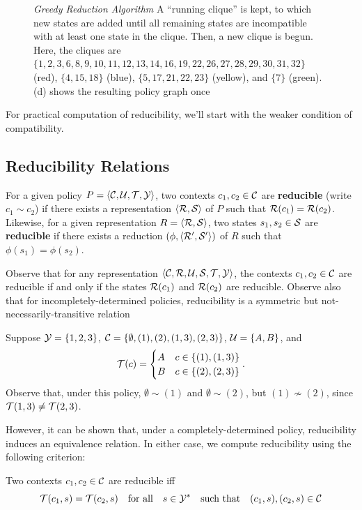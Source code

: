\begin{figure}[ht]
\caption{\emph{Greedy Reduction Algorithm} A ``running clique'' is kept, to which new states are added until all remaining states are
incompatible with at least one state in the clique.  Then, a new clique is begun.  
Here, the cliques are 
$\{1, 2, 3, 6, 8, 9, 10, 11, 12, 13, 14, 16, 19, 22, 26, 27, 28, 29, 30, 31, 32\}$ (red),
$\{4, 15, 18\}$ (blue), $\{5, 17, 21, 22, 23\}$ (yellow), and $\{7\}$ (green). (d) shows the resulting policy graph once 
}
\end{figure}
For practical computation of reducibility, we'll start with the weaker condition of compatibility.

\subsection{Reducibility Relations}

\begin{definition}[Reducibility]
For a given policy $P=\ang{\C,\U,\T,\Y}$, two contexts $c_1, c_2\in\C$ are \textbf{reducible} (write $c_1\sim c_2$) if there exists a representation 
$\ang{\R,\S}$ of $P$ such that $\R(c_1)=\R(c_2)$.  Likewise, for a given representation $R=\ang{\R,\S}$, two states 
$s_1,s_2\in\S$ are \textbf{reducible} if there exists a reduction $(\phi, \ang{\R\1,\S\1})$ of $R$ such that
$\phi(s_1)=\phi(s_2)$.
\end{definition}
Observe that for any representation $\ang{\C,\R,\U,\S,\T,\Y}$,
the contexts $c_1, c_2\in\C$ are reducible if and only if the states $\R(c_1)$ and $\R(c_2)$ are reducible.
Observe also that for incompletely-determined policies, reducibility is a symmetric but not-necessarily-transitive relation
\begin{example}
Suppose $\Y=\{1,2,3\}$, $\C=\{\emptyset, (1), (2), (1,3), (2,3)\}$, \mbox{$\U=\{A,B\}$}, and 
\begin{equation}
\T(c) = \begin{cases}
A&c\in\{(1), (1,3)\}\\
B&c\in\{(2), (2,3)\}
\end{cases}.
\end{equation} 
Observe that, under this policy, $\emptyset\sim(1)$ and $\emptyset\sim(2)$, but $(1)\not\sim(2)$, 
since $\T(1,3)\neq\T(2,3)$.
\end{example}
However, it can be shown that, under a completely-determined policy, reducibility induces an equivalence relation.  
In either case, we compute reducibility using the following criterion:
\begin{lemma}
Two contexts $c_1,c_2\in\C$ are reducible iff 
\begin{equation}
\T(c_1,s)=\T(c_2,s)\qtx{for all}s\in\Y^*\qtx{such that}(c_1,s),(c_2,s)\in\C
\end{equation} 
\end{lemma}

